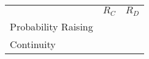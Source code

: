 \documentclass[letterpaper]{article}
\newcommand{\cmark}{\ding{51}}%
\providecommand{\cw}{\hspace{0.08in}}
\begin{document}
 
\begin{table*}
\begin{small}
\begin{tabular}{l@{\cw}c@{\cw}c}
 & $R_C$ & $R_D$\\
Probability Raising &    & \cmark   \\  
Continuity &    \cmark  &  \\  
\end{tabular}
\end{small}
\end{table*}
\end{document}
